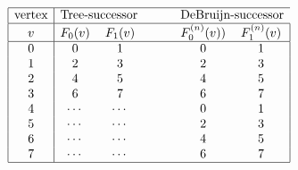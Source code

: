 \[
\begin{array}{|c|ccccc|}
\hline
\mbox{vertex} & \multicolumn{2}{c}{\mbox{Tree-successor}} & \hspace*{.2in} & \multicolumn{2}{c}{\mbox{DeBruijn-successor}} \\
\hline
v & F_0(v) & F_1(v) & & F^{(n)}_0(v))& F^{(n)}_1(v) \\
\hline
0 & 0 & 1 & & 0 & 1 \\ 
1 & 2 & 3 & & 2 & 3 \\
2 & 4 & 5 & & 4 & 5 \\
3 & 6 & 7 & & 6 & 7 \\
4 & \cdots & \cdots  & & 0 & 1 \\
5 & \cdots & \cdots  & & 2 & 3 \\
6 & \cdots & \cdots  & & 4 & 5 \\
7 & \cdots & \cdots  & & 6 & 7 \\
\hline
\end{array}
\]
